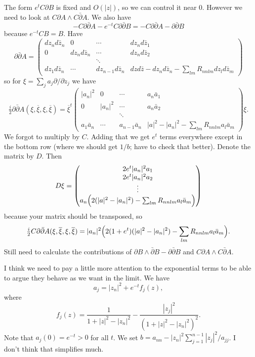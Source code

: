 \documentclass[10pt,a4paper]{amsart}
\def\ov#1{\overline{#1}}
\begin{document}
The form $e^t C \partial B$ is fixed and $O(|z|)$, so we can control it near $0$.
However we need to look at $C \partial A \wedge C \bar\partial A$.
We also have
$$
- C \partial\bar\partial A - e^{-t} C \partial\bar\partial B
= - C \partial\bar\partial A - \partial\bar\partial B
$$
because $e^{-t} C B = B$.
Have
$$
\partial\bar\partial A
=
\begin{pmatrix}
dz_n d\bar z_n & 0 & \cdots & dz_n d\bar z_1
\\
0 & dz_n d\bar z_n & \cdots & dz_n d\bar z_2
\\
& & \ddots &
\\
dz_1 d\bar z_n & \cdots & d z_{n-1} d\bar z_n &
dzd\bar z - dz_n d\bar z_n - \sum\limits_{lm} R_{nnlm} d z_l d\bar z_m
\end{pmatrix}
$$
so for $\xi = \sum_j a_j \partial/\partial z_j$ we have
$$
\tfrac i2 \partial\bar\partial A(\xi,\ov\xi,\xi,\ov\xi)
=
\ov\xi^t \begin{pmatrix}
|a_n|^2 & 0 & \cdots & a_n \bar a_1
\\
0 & |a_n|^2 & \cdots & a_n \bar a_2
\\
& & \ddots &
\\
a_1 \bar a_n & \cdots & a_{n-1} \bar a_n &
|a|^2 - |a_n|^2 - \sum\limits_{lm} R_{nnlm} a_l \bar a_m
\end{pmatrix}
\xi.
$$
We forgot to multiply by $C$. Adding that we get
$e^{t}$ terms everywhere except in the bottom row
(where we should get $1/b$; have to check that better).
Denote the matrix by $D$.
Then
$$
D \xi
= \begin{pmatrix}
2 e^t |a_n|^2 a_1
\\
2 e^t |a_n|^2 a_2
\\
\vdots
\\
a_n \Bigl(
2(|a|^2 - |a_n|^2)
- \sum_{lm} R_{nnlm} a_l \bar a_m
\Bigr)
\end{pmatrix}
$$
because your matrix should be transposed,
so
$$
\tfrac i2 C \partial\bar\partial A(\xi,\ov\xi,\xi,\ov\xi)
= |a_n|^2\Bigl(
2(1+e^{t})(|a|^2 - |a_n|^2)
- \sum_{lm} R_{nnlm} a_l \bar a_m
\Bigr).
$$
Still need to calculate the contributions of
$\partial B \wedge \bar\partial B - \partial\bar\partial B$
and $C\partial A \wedge C \bar\partial A$.

I think we need to pay a little more attention to the exponential terms to
be able to argue they behave as we want in the limit.
We have
$$
a_j = |z_n|^2 + e^{-t} f_j(z),
$$
where
$$
f_j(z) = \frac{1}{1 + |z|^2 - |z_n|^2} - \frac{|z_j|^2}{(1+|z|^2-|z_n|^2)^2}.
$$
Note that $a_j(0) = e^{-t} > 0$ for all $t$.
We set $b = a_{nn} - |z_n|^2 \sum_{j=1}^{n-1} |z_j|^2/a_{jj}$.
I don't think that simplifies much.







\end{document}
